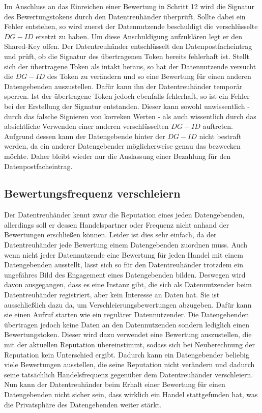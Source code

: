 \documentclass{scrreprt}
\begin{document}
\begin{enumerate}
    Im Anschluss an das Einreichen einer Bewertung in Schritt 12 wird die Signatur des Bewertungstokens durch den Datentreuhänder überprüft. Sollte dabei ein Fehler entstehen, so wird zuerst der Datennutzende beschuldigt die verschlüsselte $DG-ID$ ersetzt zu haben. Um diese Anschuldigung aufzuklären legt er den Shared-Key offen. Der Datentreuhänder entschlüsselt den Datenpostfacheintrag und prüft, ob die Signatur des übertragenen Token bereits fehlerhaft ist. Stellt sich der übertragene Token als intakt heraus, so hat der Datennutzende versucht die $DG-ID$ des Token zu verändern und so eine Bewertung für einen anderen Datengebenden auszustellen. Dafür kann ihn der Datentreuhänder temporär sperren. Ist der übertragene Token jedoch ebenfalls fehlerhaft, so ist ein Fehler bei der Erstellung der Signatur entstanden. Dieser kann sowohl unwissentlich - durch das falsche Signieren von korreken Werten - als auch wissentlich durch das absichtliche Verwenden einer anderen verschlüsselten $DG-ID$ auftreten. Aufgrund dessen kann der Datengebende hinter der $DG-ID$ nicht bestraft werden, da ein anderer Datengebender möglicherweise genau das bezwecken möchte. Daher bleibt wieder nur die Auslassung einer Bezahlung für den Datenpostfacheintrag.
\end{enumerate}

\subsection{Bewertungsfrequenz verschleiern}
Der Datentreuhänder kennt zwar die Reputation eines jeden Datengebenden, allerdings soll er dessen Handelspartner oder Frequenz nicht anhand der Bewertungen erschließen können. Leider ist dies sehr einfach, da der Datentreuhänder jede Bewertung einem Datengebenden zuordnen muss. Auch wenn nicht jeder Datennutzende eine Bewertung für jeden Handel mit einem Datengebenden ausstellt, lässt sich so für den Datentreuhänder trotzdem ein ungefähres Bild des Engagement eines Datengebenden bilden. Deswegen wird davon ausgegangen, dass es eine Instanz gibt, die sich als Datennutzender beim Datentreuhänder registriert, aber kein Interesse an Daten hat. Sie ist ausschließlich dazu da, um Verschleierungsbewertungen abzugeben. Dafür kann sie einen Aufruf starten wie ein regulärer Datennutzender. Die Datengebenden übertragen jedoch keine Daten an den Datennutzenden sondern lediglich einen Bewertungstoken. Dieser wird dazu verwendet eine Bewertung auszustellen, die mit der aktuellen Reputation übereinstimmt, sodass sich bei Neuberechnung der Reputation kein Unterschied ergibt. Dadurch kann ein Datengebender beliebig viele Bewertungen ausstellen, die seine Reputation nicht verändern und dadurch seine tatsächlich Handelsfrequenz gegenüber dem Datentreuhänder verschleiern. Nun kann der Datentreuhänder beim Erhalt einer Bewertung für einen Datengebenden nicht sicher sein, dass wirklich ein Handel stattgefunden hat, was die Privatsphäre des Datengebenden weiter stärkt.\\
\end{document}
